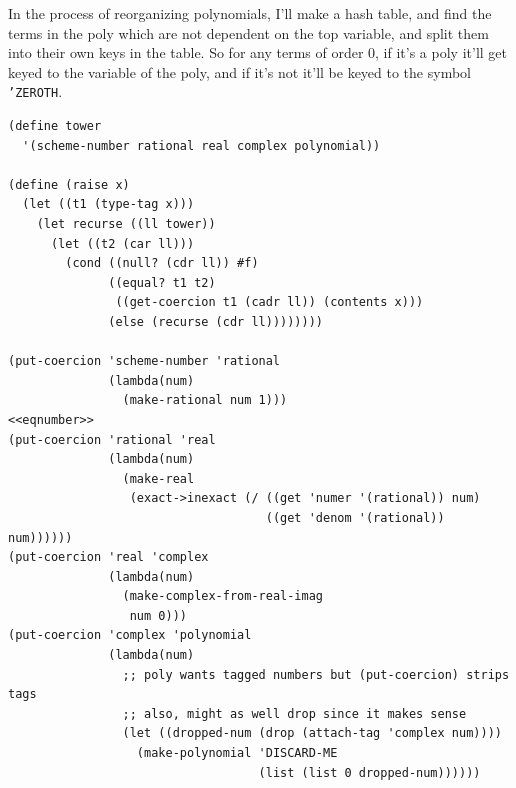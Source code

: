 \documentclass[final,fleqn,titlepage,twoside]{article}
\begin{document}
In the process of reorganizing polynomials, I'll make a hash table, and find the
terms in the poly which are not dependent on the top variable, and split them
into their own keys in the table. So for any terms of order 0, if it's a poly
it'll get keyed to the variable of the poly, and if it's not it'll be keyed to
the symbol \texttt{'ZEROTH}.

\begin{verbatim}
(define tower
  '(scheme-number rational real complex polynomial))

(define (raise x)
  (let ((t1 (type-tag x)))
    (let recurse ((ll tower))
      (let ((t2 (car ll)))
        (cond ((null? (cdr ll)) #f)
              ((equal? t1 t2)
               ((get-coercion t1 (cadr ll)) (contents x)))
              (else (recurse (cdr ll))))))))

(put-coercion 'scheme-number 'rational
              (lambda(num)
                (make-rational num 1)))
<<eqnumber>>
(put-coercion 'rational 'real
              (lambda(num)
                (make-real
                 (exact->inexact (/ ((get 'numer '(rational)) num)
                                    ((get 'denom '(rational)) num))))))
(put-coercion 'real 'complex
              (lambda(num)
                (make-complex-from-real-imag
                 num 0)))
(put-coercion 'complex 'polynomial
              (lambda(num)
                ;; poly wants tagged numbers but (put-coercion) strips tags
                ;; also, might as well drop since it makes sense
                (let ((dropped-num (drop (attach-tag 'complex num))))
                  (make-polynomial 'DISCARD-ME
                                   (list (list 0 dropped-num))))))
\end{verbatim}
\end{document}

